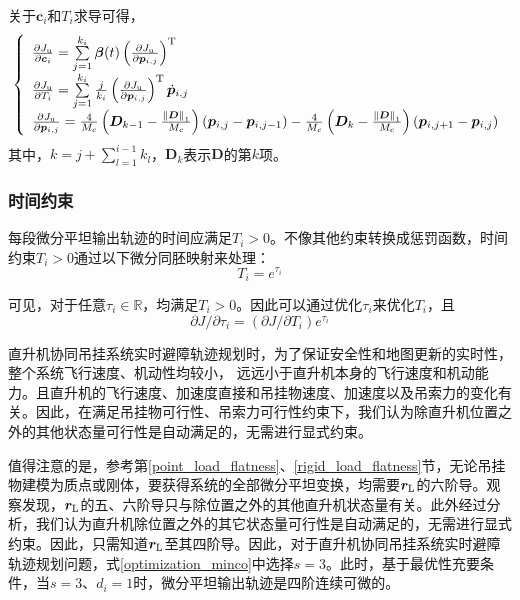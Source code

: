 关于$\boldsymbol{c}_i$和$T_i$求导可得，
\begin{equation}
    \left\{
    \begin{array}{l}
        \frac{\partial J_{\rm{u}}}{\partial \boldsymbol{c}_i} = \sum\limits_{j=1}^{k_i} \boldsymbol{\beta}(t) \left(\frac{\partial J_{\rm{u}}}{\partial \boldsymbol{p}_{i,j}}\right)^{\rm{T}}\\
        \frac{\partial J_{\rm{u}}}{\partial T_i} = \sum\limits_{j=1}^{k_i}\frac{j}{k_i}\left(\frac{\partial J_{\rm{u}}}{\partial \boldsymbol{p}_{i,j}}\right)^{\rm{T}}\dot{\boldsymbol{p}}_{i,j}\\
        \frac{\partial J_{\rm{u}}}{\partial \boldsymbol{p}_{i,j}} = \frac{4}{M_c}\left(\boldsymbol{D}_{k-1} - \frac{\left\| \boldsymbol{D} \right\|_1}{M_c}\right)\left(\boldsymbol{p}_{i,j} - \boldsymbol{p}_{i,j-1}\right) - \frac{4}{M_c}\left(\boldsymbol{D}_{k} - \frac{\left\| \boldsymbol{D} \right\|_1}{M_c}\right)\left(\boldsymbol{p}_{i,j+1} - \boldsymbol{p}_{i,j}\right)
    \end{array}
    \right.
\end{equation}
其中，$k = j + \sum\nolimits_{l=1}^{i-1}{k_l}$，$\boldsymbol{D}_{k}$表示$\boldsymbol{D}$的第$k$项。
\subsubsection{时间约束}
每段微分平坦输出轨迹的时间应满足$T_i > 0$。不像其他约束转换成惩罚函数，时间约束$T_i > 0$通过以下微分同胚映射来处理：
\begin{equation}
    T_i = e^{\tau_i}
\end{equation}

可见，对于任意$\tau_i \in \mathbb{R}$，均满足$T_i > 0$。因此可以通过优化$\tau_i$来优化$T_i$，且
\begin{equation}
    \partial J / \partial \tau_i = \left(\partial J / \partial T_i\right)e^{\tau_i}
\end{equation}

\hspace*{\fill}

直升机协同吊挂系统实时避障轨迹规划时，为了保证安全性和地图更新的实时性，整个系统飞行速度、机动性均较小， 远远小于直升机本身的飞行速度和机动能力。且直升机的飞行速度、加速度直接和吊挂物速度、加速度以及吊索力的变化有关。因此，在满足吊挂物可行性、吊索力可行性约束下，我们认为除直升机位置之外的其他状态量可行性是自动满足的，无需进行显式约束。

值得注意的是，参考第\ref{point_load_flatness}、\ref{rigid_load_flatness}节，无论吊挂物建模为质点或刚体，要获得系统的全部微分平坦变换，均需要$\boldsymbol{r}_{\rm{L}}$的六阶导。观察发现，$\boldsymbol{r}_{\rm{L}}$的五、六阶导只与除位置之外的其他直升机状态量有关。此外经过分析，我们认为直升机除位置之外的其它状态量可行性是自动满足的，无需进行显式约束。因此，只需知道$\boldsymbol{r}_{\rm{L}}$至其四阶导。因此，对于直升机协同吊挂系统实时避障轨迹规划问题，式\ref{optimization_minco}中选择$s = 3$。此时，基于最优性充要条件，当$s = 3$、$d_i = 1$时，微分平坦输出轨迹是四阶连续可微的。


